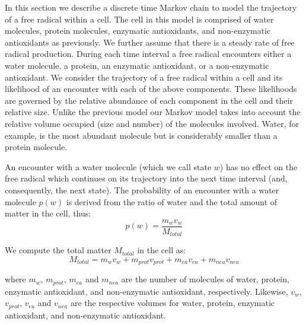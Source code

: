 \documentclass[preprint,12pt,authoryear]{elsarticle}
\begin{document}
In this section we describe a discrete time Markov chain to model the
trajectory of a free radical within a cell. The cell in this model is comprised
of water molecules, protein molecules, enzymatic antioxidants, and non-enzymatic
antioxidants as previously. We further assume that there is a steady rate of free radical production.
During each time interval a free radical encounters either a water molecule, a
protein, an enzymatic antioxidant, or a non-enzymatic antioxidant.
We consider the trajectory of a free radical within a cell and its
likelihood of an encounter with each of the above components.
These likelihoods are governed by the relative abundance of each
component in the cell and their relative size.
Unlike the previous model our Markov model takes into account the relative volume occupied (size and number) of the molecules 
involved. Water, for example, is the most abundant molecule but is considerably smaller than a protein molecule.



An encounter with a water molecule (which we call state $w$)
has no effect on the free radical which  continues on its trajectory into
the next time interval (and, consequently, the next state).
The probability of an encounter with a water molecule $p(w)$ is derived from the ratio
of water and the total amount of matter in the cell, thus:
\begin{equation}
p(w) = \frac{m_{w} v_{w}} {M_{total}}
\end{equation}

We compute the total matter $M_{total}$ in the cell as:
\begin{equation}
M_{total} = m_{w} v_{w} + m_{prot} v_{prot} + m_{ea} v_{ea} + m_{nea} v_{nea}
\end{equation}

{\parindent0pt
where $m_{w}$, $m_{prot}$, $m_{ea}$ and $m_{nea}$ are the number of molecules of water, protein, enzymatic antioxidant, and non-enzymatic antioxidant, respectively.
Likewise, $v_{w}$, $v_{prot}$, $v_{ea}$ and $v_{nea}$ are the respective volumes for water, protein, enzymatic antioxidant, and non-enzymatic antioxidant.
}
\end{document}
